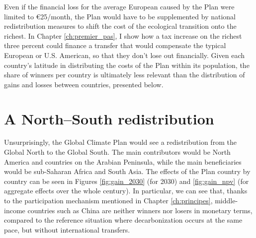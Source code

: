 \documentclass[a5paper,english,openany]{memoir}
\begin{document}
Even if the financial loss for the average European caused by the Plan were limited to %
\euro{}25/month, the Plan would have to be supplemented by national redistribution measures to shift the cost of the ecological transition %
onto the richest. In Chapter \ref{ch:premier_pas}, I show how a tax increase on the richest %
three percent %
could finance a transfer that would compensate the typical European or U.S. American, so that they don't lose out financially. Given each country's latitude in distributing the costs of the Plan within its population, the share of winners per country is ultimately less relevant %
than the distribution of gains and losses between countries, presented below.


\section{A North--South redistribution}

Unsurprisingly, the Global Climate Plan would see a redistribution from the Global North to the Global South. The main contributors would be North America and countries on the Arabian Peninsula, while the main beneficiaries would be sub-Saharan Africa and South Asia. The effects of the Plan country by country can be seen in Figures \ref{fig:gain_2030} (for 2030) and \ref{fig:gain_npv} (for aggregate effects over the whole century). In particular, we can see that, thanks to the participation mechanism mentioned in Chapter \ref{ch:principes}, middle-income countries such as China are neither winners nor losers in monetary terms, compared to the reference situation where decarbonization occurs %
at the same pace, %
but without international transfers. 
\end{document}
